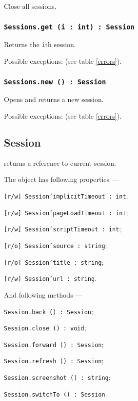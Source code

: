 Close all sessions.

\subsubsection{\texttt{Sessions.get (i : int) : Session}}

Returns the \texttt{i}th session.

Possible exceptions:  (see table \ref{errors}).

\subsubsection{\texttt{Sessions.new () : Session}}

Opens and returns a new session.

Possible exceptions:  (see table \ref{errors}).

\subsection{Session}

\session{} returns a reference to current session.

The object \session{} has following properties —
\begin{icItems}
	\item \texttt{[r/w] Session'implicitTimeout : int};
	\item \texttt{[r/w] Session'pageLoadTimeout : int};
	\item \texttt{[r/w] Session'scriptTimeout : int};
	\item \texttt{[r/o] Session'source : string};
	\item \texttt{[r/o] Session'title : string};
	\item \texttt{[r/w] Session'url : string}.
\end{icItems}

And following methods —
\begin{icItems}
	\item \texttt{Session.back () : Session};
	\item \texttt{Session.close () : void};
	\item \texttt{Session.forward () : Session};
	\item \texttt{Session.refresh () : Session};
	\item \texttt{Session.screenshot () : string};
	\item \texttt{Session.switchTo () : Session}.
\end{icItems}

